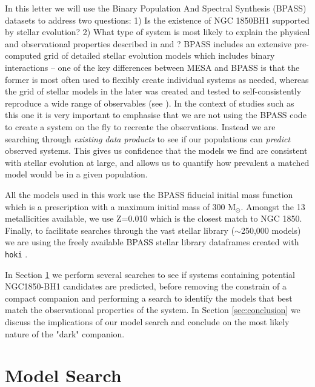\documentclass[fleqn,usenatbib]{mnras}
\newcommand{\msol} {M$_{\odot}$}
\newcommand{\about} {$\sim$}
\begin{document}
In this letter we will use the Binary Population And Spectral Synthesis (BPASS) datasets to address two questions: 1) Is the existence of NGC 1850BH1 supported by stellar evolution? 2) What type of system is most likely to explain the physical and observational properties described in \cite{saracino2021} and \cite{el-badry2021}?
BPASS includes an extensive pre-computed grid of detailed stellar evolution models which includes binary interactions -- one of the key differences between MESA and BPASS is that the former is most often used to flexibly create individual systems as needed, whereas the grid of stellar models in the later was created and tested to self-consistently reproduce a wide range of observables (see \citealt{eldridge2017, stanway2018}).
In the context of studies such as this one it is very important to emphasise that we are not using the BPASS code to create a system on the fly to recreate the observations. 
Instead we are searching through \textit{existing data products} to see if our populations can \textit{predict} observed systems. 
This gives us confidence that the models we find are consistent with stellar evolution at large, and allows us to quantify how prevalent a matched model would be in a given population. 

All the models used in this work use the BPASS fiducial initial mass function which is a \cite{kroupa2001} prescription with a maximum initial mass of 300 \msol.
Amongst the 13 metallicities available, we use Z=0.010 which is the closest match to NGC 1850. 
Finally, to facilitate searches through the vast stellar library (\about 250,000 models) we are using the freely available BPASS stellar library dataframes created with {\tt hoki} \citep{stevance2020, stevance2020d}.

In Section \ref{sec:search} we perform several searches to see if systems containing potential NGC1850-BH1 candidates are predicted, before removing the constrain of a compact companion and performing a search to identify the models that best match the observational properties of the system.
In Section \ref{sec:conclusion} we discuss the implications of our model search and conclude on the most likely nature of the "dark" companion. 


\section{Model Search}
\label{sec:search}
\end{document}
